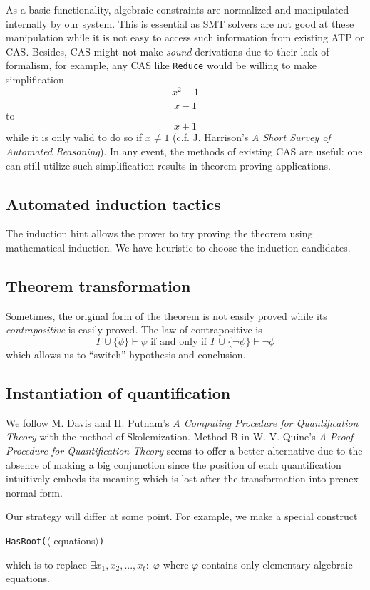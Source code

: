 \documentclass[12pt]{article}
\begin{document}
As a basic functionality, algebraic constraints are normalized and manipulated internally by our system. This is essential as SMT solvers are not good at these manipulation while it is not easy to access such information from existing ATP or CAS. Besides, CAS might not make \emph{sound} derivations due to their lack of formalism, for example, any CAS like \texttt{Reduce} would be willing to make simplification
$$\frac{x^2-1}{x-1}$$
to
$$x+1$$
while it is only valid to do so if $x \not= 1$ (c.f. J. Harrison's \emph{A Short Survey of Automated Reasoning}). In any event, the methods of existing CAS are useful: one can still utilize such simplification results in theorem proving applications.

\subsection{Automated induction tactics}

The induction hint allows the prover to try proving the theorem using mathematical induction. We have heuristic to choose the induction candidates.

\subsection{Theorem transformation}

Sometimes, the original form of the theorem is not easily proved while its \emph{contrapositive} is easily proved. The law of contrapositive is
$$\Gamma \cup \{\phi\} \vdash \psi \text{ if and only if } \Gamma \cup \{\neg \psi\} \vdash \neg \phi$$
which allows us to ``switch'' hypothesis and conclusion.

\subsection{Instantiation of quantification}

We follow M. Davis and H. Putnam's \emph{A Computing Procedure for Quantification Theory} with the method of Skolemization. Method B in W. V. Quine's \emph{A Proof Procedure for Quantification Theory} seems to offer a better alternative due to the absence of making a big conjunction since the position of each quantification intuitively embeds its meaning which is lost after the transformation into prenex normal form.

Our strategy will differ at some point. For example, we make a special construct
\begin{center}
\texttt{HasRoot(}$\langle$ equations$\rangle$\texttt{)}
\end{center}
which is to replace $\exists x_1, x_2, ..., x_t :\; \varphi$ where $\varphi$ contains only elementary algebraic equations.
\end{document}
